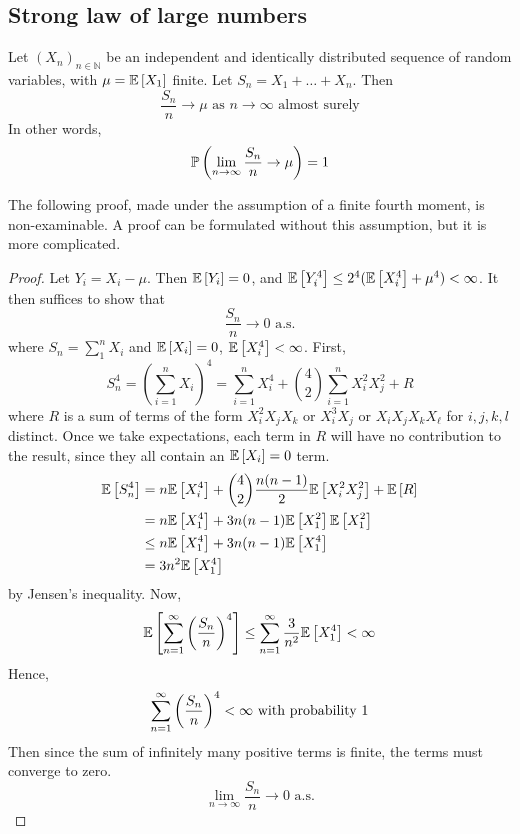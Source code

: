 \subsection{Strong law of large numbers}
\begin{theorem}
	Let \((X_n)_{n \in \mathbb N}\) be an independent and identically distributed sequence of random variables, with \(\mu = \mathbb{E}\left[{X_1}\right]\) finite.
	Let \(S_n = X_1 + \dots + X_n\).
	Then
	\[
		\frac{S_n}{n} \to \mu \text{ as } n \to \infty \text{ almost surely}
	\]
	In other words,
	\[
		\mathbb{P}\left({\lim_{n \to \infty}\frac{S_n}{n}\to \mu}\right) = 1
	\]
\end{theorem}
The following proof, made under the assumption of a finite fourth moment, is non-examinable.
A proof can be formulated without this assumption, but it is more complicated.
\begin{proof}
	Let \(Y_i = X_i - \mu\).
	Then \(\mathbb{E}\left[{Y_i}\right] = 0\), and \(\mathbb{E}\left[{Y_i^4}\right] \leq 2^4(\mathbb{E}\left[{X_i^4}\right] + \mu^4) < \infty\).
	It then suffices to show that
	\[
		\frac{S_n}{n} \to 0 \text{ a.s.}
	\]
	where \(S_n = \sum_1^n X_i\) and \(\mathbb{E}\left[{X_i}\right] = 0\), \(\mathbb{E}\left[{X_i^4}\right] < \infty\).
	First,
	\[
		S_n^4 = \left( \sum_{i=1}^n X_i \right)^4 = \sum_{i=1}^n X_i^4 + \binom{4}{2}\sum_{i=1}^n X_i^2 X_j^2 + R
	\]
	where \(R\) is a sum of terms of the form \(X_i^2 X_j X_k\) or \(X_i^3 X_j\) or \(X_i X_j X_k X_\ell\) for \(i, j, k, l\) distinct.
	Once we take expectations, each term in \(R\) will have no contribution to the result, since they all contain an \(\mathbb{E}\left[{X_i}\right] = 0\) term.
	\begin{align*}
		\mathbb{E}\left[{S_n^4}\right] & = n\mathbb{E}\left[{X_i^4}\right] + \binom{4}{2}\frac{n(n-1)}{2}\mathbb{E}\left[{X_i^2 X_j^2}\right] + \mathbb{E}\left[{R}\right] \\
		               & = n\mathbb{E}\left[{X_1^4}\right] + 3n(n-1)\mathbb{E}\left[{X_1^2}\right]\mathbb{E}\left[{X_1^2}\right]                           \\
		               & \leq n\mathbb{E}\left[{X_1^4}\right] + 3n(n-1)\mathbb{E}\left[{X_1^4}\right]                                      \\
		               & = 3n^2\mathbb{E}\left[{X_1^4}\right]
	\end{align*}
	by Jensen's inequality.
	Now,
	\[
		\mathbb{E}\left[{\sum_{n=1}^\infty \qty(\frac{S_n}{n})^4}\right] \leq \sum_{n=1}^\infty \frac{3}{n^2}\mathbb{E}\left[{X_1^4}\right] < \infty
	\]
	Hence,
	\[
		\sum_{n=1}^\infty \qty(\frac{S_n}{n})^4 < \infty \text{ with probability 1}
	\]
	Then since the sum of infinitely many positive terms is finite, the terms must converge to zero.
	\[
		\lim_{n\to\infty}\frac{S_n}{n} \to 0 \text{ a.s.}
	\]
\end{proof}

